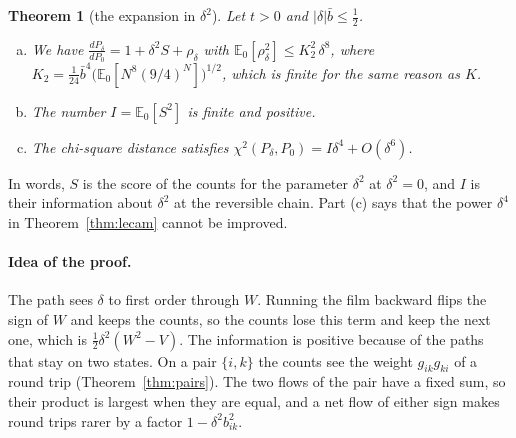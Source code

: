 \documentclass[11pt]{article}
\newtheorem{theorem}{Theorem}[section]
\theoremstyle{definition}
\theoremstyle{remark}
\newcommand{\E}{\mathbb E}
\begin{document}
\begin{theorem}[the expansion in $\delta^2$]\label{thm:regular}
Let $t>0$ and $\lvert\delta\rvert\bar b\le\frac12$.
\begin{enumerate}[(a),itemsep=1pt]
\item We have $\displaystyle\frac{dP_\delta}{dP_0}=1+\delta^2S+\rho_\delta$ with
 $\E_0[\rho_\delta^2]\le K_2^2\,\delta^8$, where
 $K_2=\frac1{24}\bar b^4\bigl(\E_0[N^8(9/4)^N]\bigr)^{1/2}$, which is finite
 for the same reason as $K$.
\item The number $I=\E_0[S^2]$ is finite and positive.
\item The chi-square distance satisfies $\chi^2(P_\delta,P_0)=I\delta^4+O(\delta^6)$.
\end{enumerate}
\end{theorem}

In words, $S$ is the score of the counts for the parameter $\delta^2$ at
$\delta^2=0$, and $I$ is their information about $\delta^2$ at the reversible
chain. Part (c) says
that the power $\delta^4$ in Theorem~\ref{thm:lecam} cannot be improved.

\paragraph{Idea of the proof.} The path sees $\delta$ to first order through
$W$. Running the film backward flips the sign of $W$ and keeps the counts, so
the counts lose this term and keep the next one, which is
$\frac12\delta^2(W^2-V)$. The information is positive because of the paths that
stay on two states. On a pair $\{i,k\}$ the counts see the weight
$g_{ik}g_{ki}$ of a round trip (Theorem~\ref{thm:pairs}). The two flows of the
pair have a fixed sum, so their product is largest when they are equal, and a
net flow of either sign makes round trips rarer by a factor
$1-\delta^2b_{ik}^2$.
\end{document}
